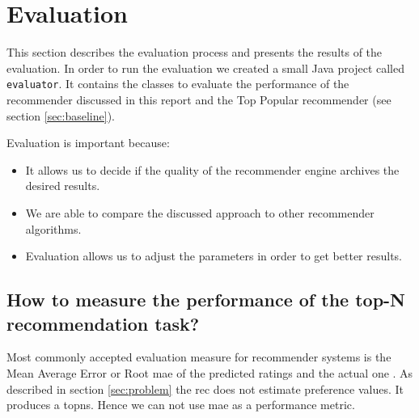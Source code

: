 \section{Evaluation}
\label{sec:evaluation}

This section describes the evaluation process and presents the results of the evaluation. In order to run the evaluation we created a small Java project called \verb|evaluator|. It contains the classes to evaluate the performance of the recommender discussed in this report and the Top Popular recommender (see section \ref{sec:baseline}).

Evaluation is important because:
\begin{itemize}
  \item It allows us to decide if the quality of the recommender engine archives the desired results. 
  \item We are able to compare the discussed approach to other recommender algorithms. 
  \item Evaluation allows us to adjust the parameters in order to get better results.
\end{itemize}

\subsection{How to measure the performance of the top-N recommendation task?}

Most commonly accepted evaluation measure for recommender systems is the Mean Average Error or Root \gls{mae} of the predicted ratings and the actual one \cite{Ricci}\cite{jannach11}.
As described in section \ref{sec:problem} the \gls{rec} does not estimate preference values. It produces a \glspl{topn}. Hence we can not use \gls{mae} as a performance metric. 

